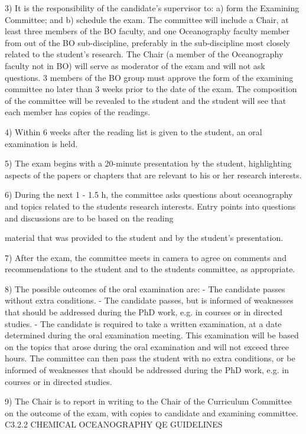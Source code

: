 3)	It is the responsibility of the candidate’s supervisor to: a) form the Examining Committee; and b) schedule the exam. The committee will include a Chair, at least three members of the BO faculty, and one Oceanography faculty member from out of the BO sub-discipline, preferably in the sub-discipline most closely related to the student’s research. The Chair (a member of the Oceanography faculty not in BO) will serve as moderator of the exam and will not ask questions. 3 members of the BO group must approve the form of the examining committee no later than 3 weeks prior to the date of the exam. The composition of the committee will be revealed to the student and the student will see that each member has copies of the readings.

4)	Within 6 weeks after the reading list is given to the student, an oral examination is held.

5)	The exam begins with a 20-minute presentation by the student, highlighting aspects of the papers or chapters that are relevant to his or her research interests.

6)	During the next 1 - 1.5 h, the committee asks questions about oceanography and topics related to the students research interests. Entry points into questions and discussions are to be based on the reading
 

material that was provided to the student and by the student’s presentation.

7)	After the exam, the committee meets in camera to agree on comments and recommendations to the student and to the students committee, as appropriate.

8)	The possible outcomes of the oral examination are:
-	The candidate passes without extra conditions.
-	The candidate passes, but is informed of weaknesses that should be addressed during the PhD work,
e.g. in courses or in directed studies.
-	The candidate is required to take a written examination, at a date determined during the oral examination meeting. This examination will be based on the topics that arose during the oral examination and will not exceed three hours. The committee can then pass the student with no extra conditions, or be informed of weaknesses that should be addressed during the PhD work, e.g. in courses or in directed studies.

9)	The Chair is to report in writing to the Chair of the Curriculum Committee on the outcome of the exam, with copies to candidate and examining committee.
C3.2.2  CHEMICAL OCEANOGRAPHY QE GUIDELINES

